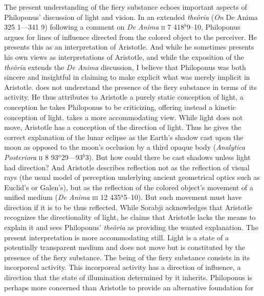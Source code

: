 The present understanding of the fiery substance echoes important aspects of Philoponus' discussion of light and vision. In an extended \emph{theôria} (\emph{On} De Anima 325 1---341 9) following a comment on \emph{De Anima} \textsc{ii} 7 418\( ^{b} \)9--10, Philoponus argues for lines of influence directed from the colored object to the perceiver. He presents this as an interpretation of Aristotle. And while he sometimes presents his own views as interpretations of Aristotle, and while the exposition of the \emph{theôria} extends the \emph{De Anima} discussion, I believe that Philoponus was both sincere and insightful in claiming to make explicit what was merely implicit in Aristotle. \citet{Sambursky:1958aa} does not understand the presence of the fiery substance in terms of its activity. He thus attributes to Aristotle a purely static conception of light, a conception he takes Philoponus to be criticizing, offering instead a kinetic conception of light. \citet[26--30]{Sorabji:1987vn} takes a more accommodating view. While light does not move, Aristotle has a conception of the direction of light. Thus he gives the correct explanation of the lunar eclipse as the Earth's shadow cast upon the moon as opposed to the moon's occlusion by a third opaque body (\emph{Analytica Posteriora} \textsc{ii} 8 93\( ^{a} \)29---93\( ^{b} \)3). But how could there be cast shadows unless light had direction? And Aristotle describes reflection not as the reflection of visual rays (the usual model of perception underlying ancient geometrical optics such as Euclid's or Galen's), but as the reflection of the colored object's movement of a unified medium (\emph{De Anima} \textsc{iii} 12 435\( ^{a} \)5--10). But such movement must have direction if it is to be thus reflected. While Sorabji acknowledges that Aristotle recognizes the directionality of light, he claims that Aristotle lacks the means to explain it and sees Philoponus' \emph{theôria} as providing the wanted explanation. The present interpretation is more accommodating still. Light is a state of a potentially transparent medium and does not move but is constituted by the presence of the fiery substance. The being of the fiery substance consists in its incorporeal activity. This incorporeal activity has a direction of influence, a direction that the state of illumination determined by it inherits. Philoponus is perhaps more concerned than Aristotle to provide an alternative foundation for 